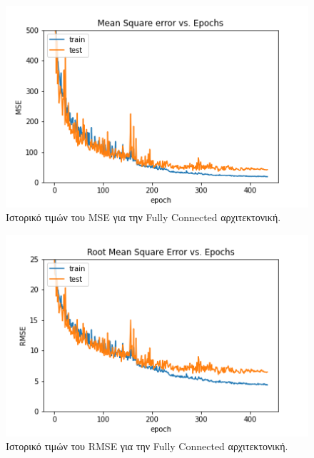 \begin{figure}[h!]
  \centering
  \includegraphics[width=\textwidth]{images/FC_MSE.png}
  \caption{Ιστορικό τιμών του MSE για την Fully Connected αρχιτεκτονική.}
  \label{fig:FC_MSE}
\end{figure}

\begin{figure}[h!]
  \centering
  \includegraphics[width=\textwidth]{images/FC_RMSE.png}
  \caption{Ιστορικό τιμών του RMSE για την Fully Connected αρχιτεκτονική.}
  \label{fig:FC_RMSE}
\end{figure}

